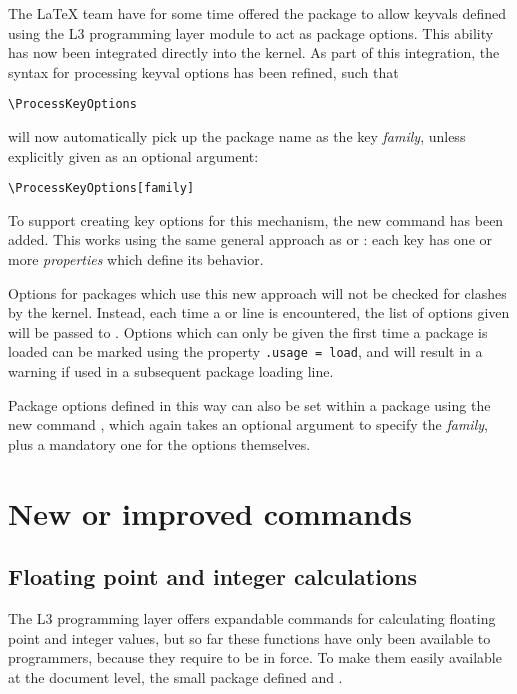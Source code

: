 \documentclass{ltnews}
\begin{document}
The \LaTeX{} team have for some time offered the package  to
allow keyvals defined using the L3 programming layer module  to act
as package options. This ability has now been integrated directly into the
kernel. As part of this integration, the syntax for processing keyval options
has been refined, such that
\begin{verbatim}
\ProcessKeyOptions
\end{verbatim}
will now automatically pick up the package name as the key \emph{family},
unless explicitly given as an optional argument:
\begin{verbatim}
\ProcessKeyOptions[family]
\end{verbatim}

To support creating key options for this mechanism, the new command
 has been added. This works using the same general
approach as  or : each key has one or more
\emph{properties} which define its behavior.

Options for packages which use this new approach will not be checked for
clashes by the kernel. Instead, each time a  or
 line is encountered, the list of options given will be
passed to . Options which can only be given
the first time a package is loaded can be marked using the property
\texttt{.usage = load}, and will result in a warning if used in a subsequent
package loading line.

Package options defined in this way can also be set within a package using
the new command , which again takes an optional argument
to specify the \emph{family}, plus a mandatory one for the options themselves.



\section{New or improved commands}


\subsection{Floating point and integer calculations}

The L3 programming layer offers expandable commands for calculating
floating point and integer values, but so far these functions have
only been available to programmers, because they require
 to be in force. To make them easily available at the
document level, the small package  defined  and
.
\end{document}
